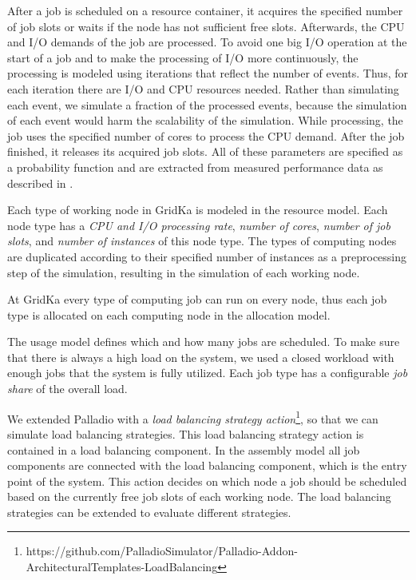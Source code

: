 \documentclass[a4paper]{jpconf}
\begin{document}
After a job is scheduled on a resource container, it acquires the specified number of job slots or waits if the node has not sufficient free slots. Afterwards, the CPU and I/O demands of the job are processed. To avoid one big I/O operation at the start of a job and to make the processing of I/O more continuously, the processing is modeled using iterations that reflect the number of events. Thus, for each iteration there are I/O and CPU resources needed. Rather than simulating each event, we simulate a fraction of the processed events, because the simulation of each event would harm the scalability of the simulation. 
While processing, the job uses the specified number of cores to process the CPU demand. After the job finished, it releases its acquired job slots. All of these parameters are specified as a probability function and are extracted from measured performance data as described in .

Each type of working node in GridKa is modeled in the resource model. Each node type has a \textit{CPU and I/O processing rate}, \textit{number of cores}, \textit{number of job slots}, and \textit{number of instances} of this node type. The types of computing nodes are duplicated according to their specified number of instances as a preprocessing step of the simulation, resulting in the simulation of each working node.

At GridKa every type of computing job can run on every node, thus each job type is allocated on each computing node in the allocation model.

The usage model defines which and how many jobs are scheduled. To make sure that there is always a high load on the system, we used a closed workload with enough jobs that the system is fully utilized. Each job type has a configurable \textit{job share} of the overall load.

We extended Palladio with a \textit{load balancing strategy action}\footnote{https://github.com/PalladioSimulator/Palladio-Addon-ArchitecturalTemplates-LoadBalancing}, so that we can simulate load balancing strategies.
This load balancing strategy action is contained in a load balancing component.
In the assembly model all job components are connected with the load balancing component, which is the entry point of the system.
This action decides on which node a job should be scheduled based on the currently free job slots of each working node. The load balancing strategies can be extended to evaluate different strategies.
\end{document}
